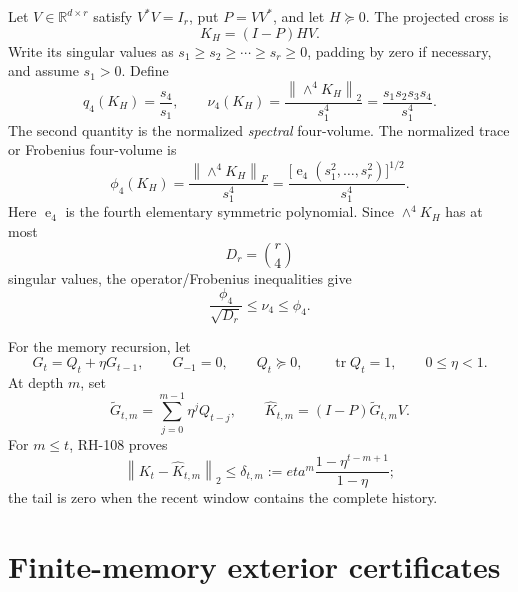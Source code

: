 \documentclass[11pt]{article}
\theoremstyle{definition}
\theoremstyle{remark}
\newcommand{\norm}[1]{\left\lVert#1\right\rVert}
\newcommand{\tr}{\operatorname{tr}}
\newcommand{\e}{\operatorname{e}}
\begin{document}
Let $V\in\mathbb R^{d\times r}$ satisfy $V^*V=I_r$, put $P=VV^*$, and let
$H\succeq0$.  The projected cross is
\begin{equation}
 K_H=(I-P)HV.
 \label{eq:cross}
\end{equation}
Write its singular values as
$s_1\ge s_2\ge\cdots\ge s_r\ge0$, padding by zero if necessary, and assume
$s_1>0$.  Define
\begin{equation}
 q_4(K_H)=\frac{s_4}{s_1},
 \qquad
 \nu_4(K_H)=\frac{\norm{\wedge^4K_H}_2}{s_1^4}
 =\frac{s_1s_2s_3s_4}{s_1^4}.
 \label{eq:qnu}
\end{equation}
The second quantity is the normalized \emph{spectral} four-volume.  The
normalized trace or Frobenius four-volume is
\begin{equation}
 \phi_4(K_H)
 =\frac{\norm{\wedge^4K_H}_F}{s_1^4}
 =\frac{\bigl[\e_4(s_1^2,\ldots,s_r^2)\bigr]^{1/2}}{s_1^4}.
 \label{eq:phi}
\end{equation}
Here $\e_4$ is the fourth elementary symmetric polynomial.  Since
$\wedge^4K_H$ has at most
\begin{equation}
 D_r=\binom r4
 \label{eq:dimension}
\end{equation}
singular values, the operator/Frobenius inequalities give
\begin{equation}
 \frac{\phi_4}{\sqrt{D_r}}\le\nu_4\le\phi_4.
 \label{eq:operator-frobenius}
\end{equation}

For the memory recursion, let
\begin{equation}
 G_t=Q_t+\eta G_{t-1},
 \qquad G_{-1}=0,
 \qquad Q_t\succeq0,
 \qquad \tr Q_t=1,
 \qquad 0\le\eta<1.
 \label{eq:memory}
\end{equation}
At depth $m$, set
\begin{equation}
 \widetilde G_{t,m}=\sum_{j=0}^{m-1}\eta^jQ_{t-j},
 \qquad
 \widehat K_{t,m}=(I-P)\widetilde G_{t,m}V.
 \label{eq:recent}
\end{equation}
For $m\le t$, RH-108 proves
\begin{equation}
 \norm{K_t-\widehat K_{t,m}}_2\le
 \delta_{t,m}:=eta^m\frac{1-\eta^{t-m+1}}{1-\eta};
 \label{eq:tail}
\end{equation}
the tail is zero when the recent window contains the complete history.

\section{Finite-memory exterior certificates}
\label{sec:certificates}
\end{document}
